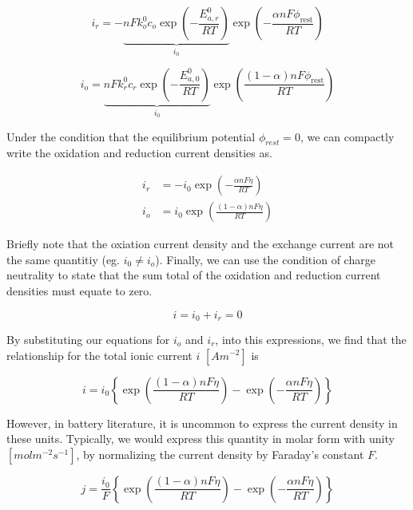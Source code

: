 \documentclass[lettersize,journal]{IEEEtran}
\begin{document}
\begin{equation}
i_{r}=-\underbrace{n F k_{o}^{0} c_{o} \exp \left(-\frac{E_{a, r}^{0}}{R T}\right)}_{i_0} \exp \left(-\frac{\alpha n F \phi_{\mathrm{rest}}}{R T}\right)
\end{equation}

\begin{equation}
i_{o}=\underbrace{n F k_{r}^{0} c_{r} \exp \left(-\frac{E_{a, 0}^{0}}{R T}\right)}_{i_0} \exp \left(\frac{(1-\alpha) n F \phi_{\mathrm{rest}}}{R T}\right)
\end{equation}

\noindent Under the condition that the equilibrium potential $\phi_{rest} = 0$, we can compactly write the oxidation and reduction current densities as.

\begin{equation}
\begin{aligned}
i_{r} &=-i_{0} \exp \left(-\frac{\alpha n F \eta}{R T}\right) \\
i_{o} &=i_{0} \exp \left(\frac{(1-\alpha) n F \eta}{R T}\right)
\end{aligned}
\end{equation}

\noindent Briefly note that the oxiation current density and the exchange current are not the same quantitiy (eg. $i_0 \ne i_o$). Finally, we can use the condition of charge neutrality to state that the sum total of the oxidation and reduction current densities must equate to zero.

\begin{equation}
i=i_{0}+i_{r}=0
\end{equation}

\noindent By substituting our equations for $i_o$ and $i_r$, into this expressions, we find that the relationship for the total ionic current $i$  $\left[ Am^{-2} \right]$ is

\begin{equation}
i=i_{0}\left\{\exp \left(\frac{(1-\alpha) n F \eta}{R T}\right)-\exp \left(-\frac{\alpha n F \eta}{R T}\right)\right\}
\end{equation}

\noindent However, in battery literature, it is uncommon to express the current density in these units. Typically, we would express this quantity in molar form with unity $\left[ mol m^{-2} s^{-1} \right]$, by normalizing the current density by Faraday's constant $F$.


\begin{equation}
j=\frac{i_{0}}{F}\left\{\exp \left(\frac{(1-\alpha) n F \eta}{R T}\right)-\exp \left(-\frac{\alpha n F \eta}{R T}\right)\right\}
\end{equation}
\end{document}
